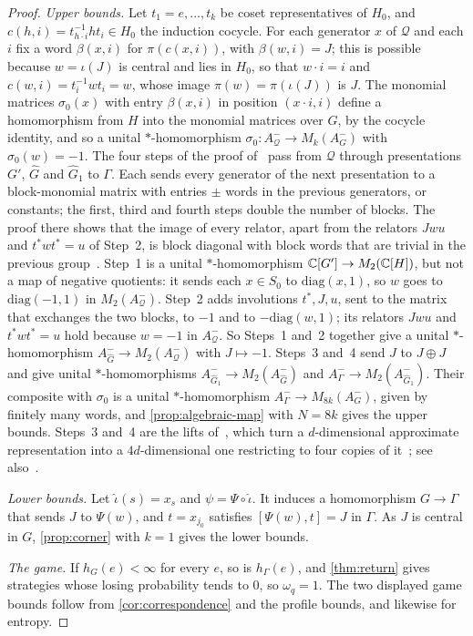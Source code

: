 \begin{proof}
\emph{Upper bounds.} Let $t_1=e,\dots,t_k$ be coset representatives of $H_0$, and $c(h,i)=t_{h\cdot i}^{-1}ht_i\in H_0$ the
induction cocycle. For each generator $x$ of $\mathcal Q$ and each $i$ fix a word $\beta(x,i)$ for $\pi(c(x,i))$, with
$\beta(w,i)=J$; this is possible because $w=\iota(J)$ is central and lies in $H_0$, so that $w\cdot i=i$ and
$c(w,i)=t_i^{-1}wt_i=w$, whose image $\pi(w)=\pi(\iota(J))$ is $J$. The monomial
matrices $\sigma_0(x)$ with entry $\beta(x,i)$ in position $(x\cdot i,i)$ define a homomorphism from $H$ into the monomial
matrices over $G$, by the cocycle identity, and so a unital $*$-homomorphism $\sigma_0:A^-_{\mathcal Q}\to M_k(A_G^-)$ with
$\sigma_0(w)=-1$. The four steps of the proof of~\cite[Lemma~B.1]{DM-game} pass from $\mathcal Q$ through presentations
$G'$, $\widehat G$ and $\widehat G_1$ to $\Gamma$. Each sends every generator of the next presentation to a block-monomial
matrix with entries $\pm$ words in the previous generators, or constants; the first, third and fourth steps double the number
of blocks. The proof there shows that the image of every relator, apart from the relators $Jwu$ and $t^*wt^*=u$ of Step~2, is
block diagonal with block words that are trivial in the previous group~\cite[proof of Lemma~B.1, and Table~3]{DM-game}. Step~1 is a unital
$*$-homomorphism $\mathbb C[G']\to M_2(\mathbb C[H])$, but not a map of negative quotients: it sends each $x\in S_0$ to $\mathrm{diag}(x,1)$, so
$w$ goes to $\mathrm{diag}(-1,1)$ in $M_2(A^-_{\mathcal Q})$. Step~2 adds involutions $t^*,J,u$, sent to the matrix that exchanges
the two blocks, to $-1$ and to $-\mathrm{diag}(w,1)$; its relators $Jwu$ and $t^*wt^*=u$ hold because $w=-1$ in $A^-_{\mathcal Q}$.
So Steps~1 and~2 together give a unital $*$-homomorphism $A^-_{\widehat G}\to M_2(A^-_{\mathcal Q})$ with $J\mapsto-1$. Steps~3
and~4 send $J$ to $J\oplus J$ and give unital $*$-homomorphisms $A^-_{\widehat G_1}\to M_2(A^-_{\widehat G})$ and
$A^-_\Gamma\to M_2(A^-_{\widehat G_1})$. Their composite with $\sigma_0$ is a unital $*$-homomorphism $A_\Gamma^-\to M_{8k}(A_G^-)$,
given by finitely many words, and \cref{prop:algebraic-map} with $N=8k$ gives the upper bounds. Steps~3 and~4 are the lifts
of~\cite[Lemma~4.4 and Proposition~4.2]{Slo19}, which turn a $d$-dimensional approximate representation into a
$4d$-dimensional one restricting to four copies of it~\cite[Remark~4.5]{Slo19}; see also~\cite[Lemma~5.8 and
Theorem~5.5]{FKMPRSZ25}.

\emph{Lower bounds.} Let $\hat\iota(s)=x_s$ and $\psi=\Psi\circ\hat\iota$. It induces a homomorphism $G\to\Gamma$ that sends
$J$ to $\Psi(w)$, and $t=x_{j_0}$ satisfies $[\Psi(w),t]=J$ in $\Gamma$. As $J$ is central in $G$, \cref{prop:corner} with
$k=1$ gives the lower bounds.

\emph{The game.} If $h_G(e)<\infty$ for every $e$, so is $h_\Gamma(e)$, and \cref{thm:return} gives strategies whose losing
probability tends to $0$, so $\omega_q=1$. The two displayed game bounds follow from \cref{cor:correspondence} and the profile
bounds, and likewise for entropy.
\end{proof}

